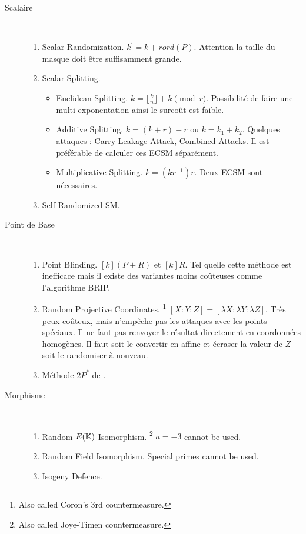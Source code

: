 \begin{description}
    \item[Scalaire] \hfill \\
        \begin{enumerate}
            \item Scalar Randomization. $k^{'} = k + r ord(P)$. Attention la taille du masque doit être suffisamment grande.  
            \item Scalar Splitting. 
                \begin{itemize}[label=--]
                    \item Euclidean Splitting. $k = \lfloor \frac{k}{n} \rfloor + k \pmod r$. Possibilité de faire une multi-exponentation \cite{ciet2003virtually} ainsi le surcoût est faible.
                    \item Additive Splitting. $k = (k + r) - r$ ou $k = k_1 + k_2$. Quelques attaques : Carry Leakage Attack, Combined Attacks. Il est préférable de calculer ces ECSM séparément. 
                    \item Multiplicative Splitting. $k = (k r^{-1}) r$. Deux ECSM sont nécessaires.
                \end{itemize}
            \item Self-Randomized SM.
        \end{enumerate}
     \item[Point de Base] \hfill \\
        \begin{enumerate}
            \item Point Blinding. $[k](P + R)$ et $[k]R$. Tel quelle cette méthode est inefficace mais il existe des variantes moins coûteuses comme l'algorithme BRIP. 
            \item Random Projective Coordinates. \footnote{Also called Coron's 3rd countermeasure.} $[X : Y : Z] = [\lambda X : \lambda Y : \lambda Z]$. Très peux coûteux, mais n'empêche pas les attaques avec les points spéciaux. Il ne faut pas renvoyer le résultat directement en coordonnées homogènes. Il faut soit le convertir en affine et écraser la valeur de $Z$ soit le randomiser à nouveau.
            \item Méthode $2P^*$ de \cite{ciet2003virtually}.
        \end{enumerate}
    \item[Morphisme] \hfill \\
        \begin{enumerate}
            \item Random $E(\mathbb{K})$ Isomorphism. \footnote{Also called Joye-Timen countermeasure.} $a = -3$ cannot be used.
            \item Random Field \field{} Isomorphism. Special primes cannot be used.
            \item Isogeny Defence. 
        \end{enumerate}
\end{description}

